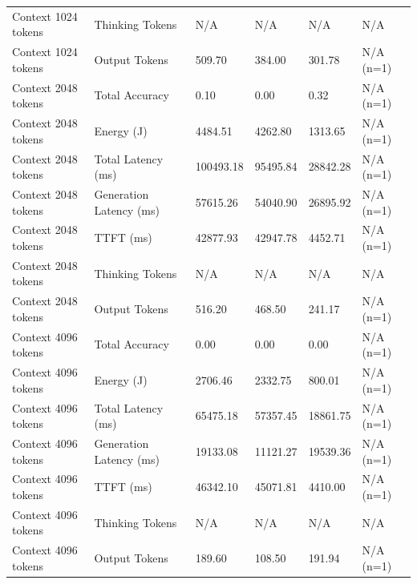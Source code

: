 \begin{table}
\begin{tabular}{llllll}
Context 1024 tokens & Thinking Tokens & N/A & N/A & N/A & N/A \\
Context 1024 tokens & Output Tokens & 509.70 & 384.00 & 301.78 & N/A (n=1) \\
Context 2048 tokens & Total Accuracy & 0.10 & 0.00 & 0.32 & N/A (n=1) \\
Context 2048 tokens & Energy (J) & 4484.51 & 4262.80 & 1313.65 & N/A (n=1) \\
Context 2048 tokens & Total Latency (ms) & 100493.18 & 95495.84 & 28842.28 & N/A (n=1) \\
Context 2048 tokens & Generation Latency (ms) & 57615.26 & 54040.90 & 26895.92 & N/A (n=1) \\
Context 2048 tokens & TTFT (ms) & 42877.93 & 42947.78 & 4452.71 & N/A (n=1) \\
Context 2048 tokens & Thinking Tokens & N/A & N/A & N/A & N/A \\
Context 2048 tokens & Output Tokens & 516.20 & 468.50 & 241.17 & N/A (n=1) \\
Context 4096 tokens & Total Accuracy & 0.00 & 0.00 & 0.00 & N/A (n=1) \\
Context 4096 tokens & Energy (J) & 2706.46 & 2332.75 & 800.01 & N/A (n=1) \\
Context 4096 tokens & Total Latency (ms) & 65475.18 & 57357.45 & 18861.75 & N/A (n=1) \\
Context 4096 tokens & Generation Latency (ms) & 19133.08 & 11121.27 & 19539.36 & N/A (n=1) \\
Context 4096 tokens & TTFT (ms) & 46342.10 & 45071.81 & 4410.00 & N/A (n=1) \\
Context 4096 tokens & Thinking Tokens & N/A & N/A & N/A & N/A \\
Context 4096 tokens & Output Tokens & 189.60 & 108.50 & 191.94 & N/A (n=1) \\
\bottomrule
\end{tabular}
\end{table}
